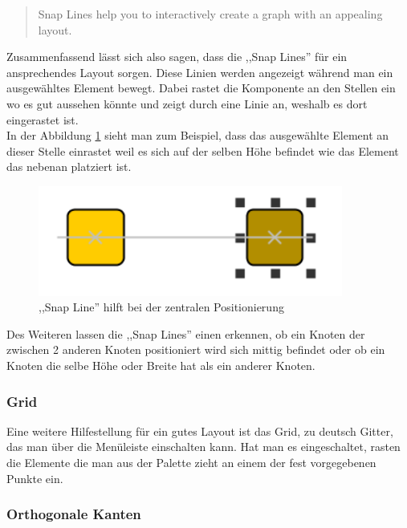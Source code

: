 \begin{quote}
    Snap Lines help you to interactively create a graph with an appealing layout.
\end{quote}

\noindent
Zusammenfassend lässt sich also sagen, dass die ,,Snap Lines'' für ein ansprechendes Layout sorgen. Diese Linien werden angezeigt während man ein ausgewähltes Element bewegt. Dabei rastet die Komponente an den Stellen ein wo es gut aussehen könnte und zeigt durch eine Linie an, weshalb es dort eingerastet ist.
\\

\noindent
In der Abbildung \ref{snapLineCenter} sieht man zum Beispiel, dass das ausgewählte Element an dieser Stelle einrastet weil es sich auf der selben Höhe befindet wie das Element das nebenan platziert ist.

\begin{figure}[!h]
	\begin{center}
		\includegraphics[width=10cm]{images/yed_snap_center.png}
		\caption{,,Snap Line'' hilft bei der zentralen Positionierung}
		\label{snapLineCenter}
	\end{center}
\end{figure}

\noindent
Des Weiteren lassen die ,,Snap Lines'' einen erkennen, ob ein Knoten der zwischen 2 anderen Knoten positioniert wird sich mittig befindet oder ob ein Knoten die selbe Höhe oder Breite hat als ein anderer Knoten.

\subsubsection{Grid}

Eine weitere Hilfestellung für ein gutes Layout ist das Grid, zu deutsch Gitter, das man über die Menüleiste einschalten kann. Hat man es eingeschaltet, rasten die Elemente die man aus der Palette zieht an einem der fest vorgegebenen Punkte ein.

\subsubsection{Orthogonale Kanten}


